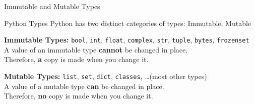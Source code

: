 \documentclass[10pt, colorlinks=true, urlcolor=blue]{beamer}
\begin{document}
\begin{frame}{Immutable and Mutable Types}
    \begin{block}{Python Types}
        Python has two distinct categories of types: Immutable, Mutable
    \end{block}

    \vspace{2em}
    
    \textbf{Immutable Types:} \texttt{bool}, \texttt{int}, \texttt{float}, \texttt{complex}, \texttt{str}, \texttt{tuple}, \texttt{bytes}, \texttt{frozenset} \\
    
    \vspace{-0.8em}
    A value of an immutable type \textbf{cannot} be changed in place. \\
    Therefore, \textbf{a} copy is made when you change it. \\
    
    \vspace{2.0em}
    
    \textbf{Mutable Types:} \texttt{list}, \texttt{set}, \texttt{dict}, \texttt{classes}, \dots (most other types) \\
    
    \vspace{-0.8em}
    A value of a mutable type \textbf{can} be changed in place. \\
    Therefore, \textbf{no} copy is made when you change it.
    
\end{frame}
\end{document}
